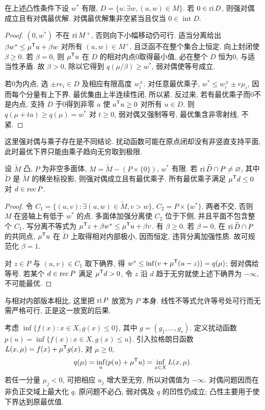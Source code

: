 \begin{theorem}[乘子存在与紧性]\label{thm:mc2}
在上述凸性条件下设 $w^*$ 有限, $D=\{u:\exists w,(u,w)\in M\}$. 若 $0\in\operatorname{ri} D$, 则强对偶成立且有对偶最优解. 对偶最优解集非空紧当且仅当 $0\in\operatorname{int}D$.
\end{theorem}
\begin{proof}
$(0,w^*)$ 不在 $\operatorname{ri} M^+$, 否则向下小幅移动仍可行. 适当分离给出
$\beta w^*\le\mu^{\mathsf T} u+\beta w$ 对所有 $(u,w)\in M^+$, 且泛函不在整个集合上恒定. 向上封闭使 $\beta\ge0$. 若 $\beta=0$, 则 $\mu^{\mathsf T} u$ 在 $D$ 的相对内点0取得最小值, 必在整个 $D$ 恒为0, 与适当性矛盾. 故 $\beta>0$, 除以它得到 $q(\mu/\beta)\ge w^*$, 弱对偶使等号成立.

若0为内点, 选 $\pm re_i\in D$ 及相应有限高度 $w_i^\pm$. 对任意最优乘子, $w^*\le w_i^\pm\pm r\mu_i$, 因而每个分量有上下界. 最优集由上半连续性闭, 所以紧. 反过来, 若有最优乘子而0不是内点, 支持 $D$ 于0得到非零 $a$ 使 $a^{\mathsf T} u\ge0$ 对所有 $u\in D$. 则 $q(\mu+ta)\ge q(\mu)=w^*$ 对 $t\ge0$, 弱对偶又强制等号, 最优集含非零射线, 不紧.
\end{proof}
这里强对偶与乘子存在是不同结论. 扰动函数可能在原点闭却没有非竖直支持平面, 此时最优下界只能由乘子趋向无穷取到极限.

\begin{theorem}[多面体加强]\label{thm:mc3}
设 $\widetilde M$ 凸, $P$ 为非空多面体, $M=\widetilde M-(P\times\{0\})$, $w^*$ 有限. 若 $\operatorname{ri}\widetilde D\cap P\ne\varnothing$, 其中 $\widetilde D$ 是 $\widetilde M$ 的横坐标投影, 则强对偶成立且有最优乘子. 所有最优乘子满足 $\mu^{\mathsf T} d\le0$ 对 $d\in\operatorname{rec} P$.
\end{theorem}
\begin{proof}
令 $C_1=\{(u,v):\exists(u,w)\in\widetilde M,v>w\}$, $C_2=P\times\{w^*\}$. 两者不交, 否则 $M$ 在竖轴上有低于 $w^*$ 的点. 多面体加强分离使 $C_2$ 位于下侧, 并且平面不包含整个 $C_1$. 写分离不等式为 $\mu^{\mathsf T} z+\beta w^*\le\mu^{\mathsf T} u+\beta v$. 有 $\beta\ge0$. 若 $\beta=0$, 在 $\operatorname{ri}\widetilde D\cap P$ 的共同点, $\mu^{\mathsf T} u$ 在 $\widetilde D$ 上取得相对内部极小, 因而恒定, 违背分离加强性质. 故可规范化 $\beta=1$.

对 $z\in P$ 与 $(u,v)\in C_1$ 取下确界, 得 $w^*\le\inf(v+\mu^{\mathsf T}(u-z))=q(\mu)$; 弱对偶给等号. 若某个 $d\in\operatorname{rec} P$ 满足 $\mu^{\mathsf T} d>0$, 令 $z$ 沿 $d$ 趋于无穷就使上述下确界为 $-\infty$, 不可能最优.
\end{proof}
与相对内部版本相比, 这里把 $\operatorname{ri} P$ 放宽为 $P$ 本身. 线性不等式允许等号处可行而无需严格可行, 正是这一放宽的后果.

考虑 $\inf\{f(x):x\in X,g(x)\le0\}$, 其中 $g=(g_1,\ldots,g_r)$. 定义扰动函数
$p(u)=\inf\{f(x):x\in X,g(x)\le u\}$. 引入拉格朗日函数 $L(x,\mu)=f(x)+\mu^{\mathsf T} g(x)$. 对 $\mu\ge0$,
\[
q(\mu)=\inf_u(p(u)+\mu^{\mathsf T} u)=\inf_{x\in X}L(x,\mu).
\]
若任一分量 $\mu_j<0$, 可把相应 $u_j$ 增大至无穷, 所以对偶值为 $-\infty$. 对偶问题因而在非负正交域上最大化 $q$. 原问题不必凸, 弱对偶及 $q$ 的凹性仍成立; 凸性主要用于使下界达到原最优值.

